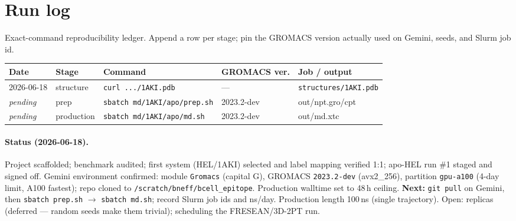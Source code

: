 \section{Run log}

Exact-command reproducibility ledger. Append a row per stage; pin the GROMACS version actually
used on Gemini, seeds, and Slurm job id.

\begin{center}
\begin{tabular}{lllll}
\toprule
Date & Stage & Command & GROMACS ver. & Job / output \\
\midrule
2026-06-18 & structure & \texttt{curl .../1AKI.pdb} & --- & \texttt{structures/1AKI.pdb} \\
\textit{pending} & prep & \texttt{sbatch md/1AKI/apo/prep.sh} & 2023.2-dev & out/npt.gro/cpt \\
\textit{pending} & production & \texttt{sbatch md/1AKI/apo/md.sh} & 2023.2-dev & out/md.xtc \\
\bottomrule
\end{tabular}
\end{center}

\paragraph{Status (2026-06-18).} Project scaffolded; benchmark audited; first system (HEL/1AKI)
selected and label mapping verified 1:1; apo-HEL run \#1 staged and signed off. Gemini
environment confirmed: module \texttt{Gromacs} (capital G), GROMACS \texttt{2023.2-dev}
(avx2\_256), partition \texttt{gpu-a100} (4-day limit, A100 fastest); repo cloned to
\texttt{/scratch/bneff/bcell\_epitope}. Production walltime set to 48\,h ceiling.
\textbf{Next:} \texttt{git pull} on Gemini, then \texttt{sbatch prep.sh} $\to$ \texttt{sbatch
md.sh}; record Slurm job ids and ns/day. Production length 100\,ns (single trajectory). Open:
replicas (deferred --- random seeds make them trivial); scheduling the FRESEAN/3D-2PT run.

